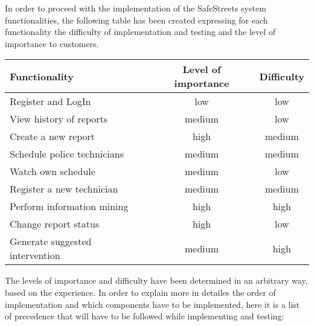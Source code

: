 In order to proceed with the implementation of the SafeStreets system functionalities, the following table has been created expressing for each functionality the difficulty of implementation and testing and the level of importance to customers.
\begin{table}[H]
    \centering
    \begin{tabularx}{\textwidth}{ |l|c|c| }
        \hline
        Functionality & Level of importance & Difficulty \\
        \hline
        Register and LogIn & low & low \\								
        \hline
        View history of reports & medium & low \\
        \hline
        Create a new report & high	& medium \\
        \hline								
        Schedule police technicians & medium & medium \\									
        \hline
        Watch own schedule & medium & low \\									
        \hline
        Register a new technician & medium & medium \\
        Perform information mining & high & high \\									
        \hline
        Change report status & high & low \\									
        \hline
        Generate suggested intervention & medium & high \\									
        \hline
    \end{tabularx}
  \end{table}
The levels of importance and difficulty have been determined in an arbitrary way, based on the experience.
In order to explain more in detailes the order of implementation and which components have to be implemented, here it is a list of precedence that will have to be followed while implementing and testing:
